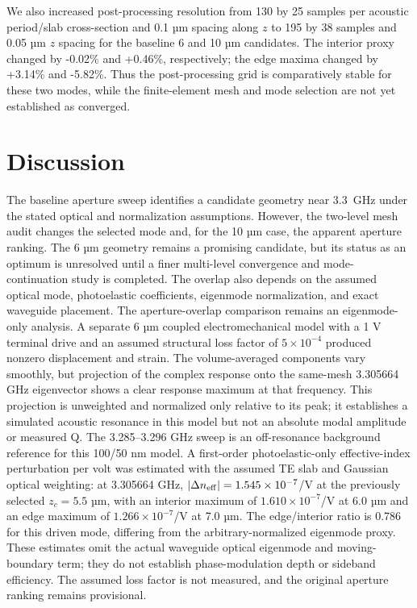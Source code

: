 \documentclass[10pt,twocolumn]{article}
\begin{document}
We also increased post-processing resolution from 130 by 25 samples per acoustic period/slab cross-section and 0.1 µm spacing along $z$ to 195 by 38 samples and 0.05 µm $z$ spacing for the baseline 6 and 10 µm candidates. The interior proxy changed by -0.02\% and +0.46\%, respectively; the edge maxima changed by +3.14\% and -5.82\%. Thus the post-processing grid is comparatively stable for these two modes, while the finite-element mesh and mode selection are not yet established as converged.

\section{Discussion}
The baseline aperture sweep identifies a candidate geometry near \SI{3.3}{\giga\hertz} under the stated optical and normalization assumptions. However, the two-level mesh audit changes the selected mode and, for the 10 µm case, the apparent aperture ranking. The 6 µm geometry remains a promising candidate, but its status as an optimum is unresolved until a finer multi-level convergence and mode-continuation study is completed. The overlap also depends on the assumed optical mode, photoelastic coefficients, eigenmode normalization, and exact waveguide placement. The aperture-overlap comparison remains an eigenmode-only analysis. A separate 6 µm coupled electromechanical model with a 1 V terminal drive and an assumed structural loss factor of $5\times10^{-4}$ produced nonzero displacement and strain. The volume-averaged components vary smoothly, but projection of the complex response onto the same-mesh 3.305664 GHz eigenvector shows a clear response maximum at that frequency. This projection is unweighted and normalized only relative to its peak; it establishes a simulated acoustic resonance in this model but not an absolute modal amplitude or measured Q. The 3.285--3.296 GHz sweep is an off-resonance background reference for this 100/50 nm model. A first-order photoelastic-only effective-index perturbation per volt was estimated with the assumed TE slab and Gaussian optical weighting: at 3.305664 GHz, $|\Delta n_{\rm eff}|=1.545\times10^{-7}$/V at the previously selected $z_c=5.5$ µm, with an interior maximum of $1.610\times10^{-7}$/V at 6.0 µm and an edge maximum of $1.266\times10^{-7}$/V at 7.0 µm. The edge/interior ratio is 0.786 for this driven mode, differing from the arbitrary-normalized eigenmode proxy. These estimates omit the actual waveguide optical eigenmode and moving-boundary term; they do not establish phase-modulation depth or sideband efficiency. The assumed loss factor is not measured, and the original aperture ranking remains provisional.
\end{document}
